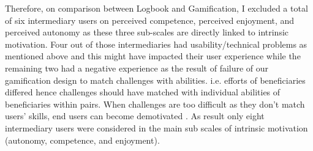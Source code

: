 \newline 
Therefore, on comparison between Logbook and Gamification, I excluded a total of six intermediary users on perceived competence, perceived enjoyment, and perceived autonomy as these three sub-scales are directly linked to intrinsic motivation. Four out of those  intermediaries had usability/technical problems as mentioned above and this might have impacted their user experience while the remaining two had a negative experience as the result of failure of our gamification design to match challenges with abilities. i.e. efforts of beneficiaries differed hence challenges should have matched with individual abilities of beneficiaries within pairs. When challenges are too difficult as they don't match users' skills, end users can become demotivated \citep{zhang2008motivational}. As result only eight intermediary users were considered in the main sub scales of intrinsic motivation (autonomy, competence, and enjoyment). 
 
